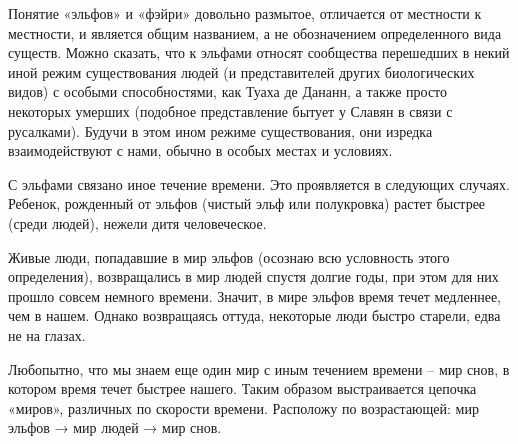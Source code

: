 
Понятие «эльфов» и «фэйри» довольно размытое, отличается от местности к местности, и является общим названием, а не обозначением определенного вида существ. Можно сказать, что к эльфами относят сообщества перешедших в некий иной режим существования людей (и представителей других биологических видов) с особыми способностями, как Туаха де Дананн, а также просто некоторых умерших (подобное представление бытует у Славян в связи с русалками). Будучи в этом ином режиме существования, они изредка взаимодействуют с нами, обычно в особых местах и условиях.



С эльфами связано иное течение времени. Это проявляется в следующих случаях. Ребенок, рожденный от эльфов (чистый эльф или полукровка) растет быстрее (среди людей), нежели дитя человеческое.

Живые люди, попадавшие в мир эльфов (осознаю всю условность этого определения), возвращались в мир людей спустя долгие годы, при этом для них прошло совсем немного времени. Значит, в мире эльфов время течет медленнее, чем в нашем. Однако возвращаясь оттуда, некоторые люди быстро старели, едва не на глазах. 

Любопытно, что мы знаем еще один мир с иным течением времени – мир снов, в котором время течет быстрее нашего. Таким образом выстраивается цепочка «миров», различных по скорости времени. Расположу по возрастающей: мир эльфов → мир людей → мир снов.


